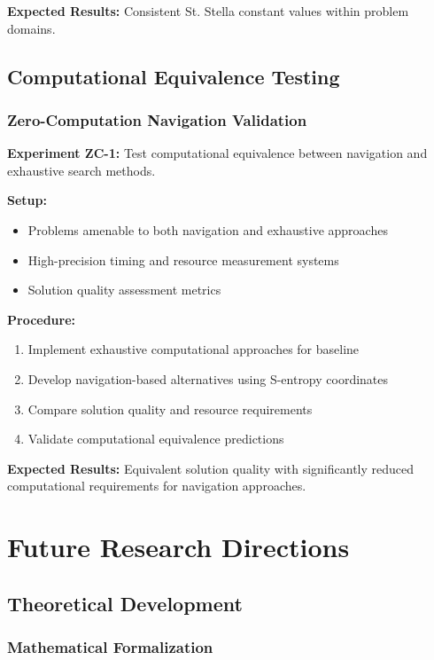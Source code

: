 \documentclass[11pt]{article}
\begin{document}
\textbf{Expected Results:} Consistent St. Stella constant values within problem domains.

\subsection{Computational Equivalence Testing}

\subsubsection{Zero-Computation Navigation Validation}

\textbf{Experiment ZC-1:} Test computational equivalence between navigation and exhaustive search methods.

\textbf{Setup:}
\begin{itemize}
\item Problems amenable to both navigation and exhaustive approaches
\item High-precision timing and resource measurement systems
\item Solution quality assessment metrics
\end{itemize}

\textbf{Procedure:}
\begin{enumerate}
\item Implement exhaustive computational approaches for baseline
\item Develop navigation-based alternatives using S-entropy coordinates
\item Compare solution quality and resource requirements
\item Validate computational equivalence predictions
\end{enumerate}

\textbf{Expected Results:} Equivalent solution quality with significantly reduced computational requirements for navigation approaches.

\section{Future Research Directions}

\subsection{Theoretical Development}

\subsubsection{Mathematical Formalization}
\end{document}
